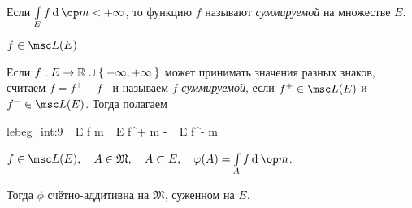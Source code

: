 \begin{definition}
	Если $ \int\limits_E f \di \op m < +\infty $, то функцию $ f $ называют \emph{суммируемой} на множестве $ E $.
\end{definition}

\begin{notation}
	$ f \in \msc L(E) $
\end{notation}

\begin{definition}
	Если $ f : E \to \mathbb{R} \cup \Set{-\infty, +\infty} $ может принимать значения разных знаков, считаем $ f = f^+ - f^- $ и называем $ f $ \emph{суммируемой}, если $ f^+ \in \msc L(E) $ и $ f^- \in \msc L(E) $.
	Тогда полагаем
	\begin{equ}{lebeg_int:9}
		\int\limits_E f \di \op m \coloneq \int\limits_E f^+ \di \op m - \int\limits_E f^- \di \op m
	\end{equ}
\end{definition}

\begin{theorem}
	$ f \in \msc L(E), \quad A \in \mathfrak M, \quad A \sub E, \quad \phi(A) = \int\limits_A f \di \op m $.

	Тогда $ \phi $ счётно-аддитивна на $ \mathfrak M $, суженном на $ E $.
\end{theorem}

